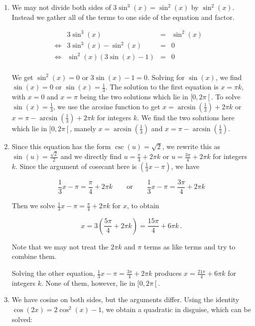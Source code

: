 \begin{example}
\begin{enumerate}
\item We may not divide both sides of $3\sin^{3}(x) = \sin^{2}(x)$ by $\sin^{2}(x)$. Instead we gather all of the terms to one side of the equation and factor.

\[ \begin{array}{rrclr}

&3\sin^{3}(x) & = &  \sin^{2}(x) & \\
\Leftrightarrow&3\sin^{3}(x) -  \sin^{2}(x) & = & 0 &  \\
\Leftrightarrow&\sin^{2}(x) (3 \sin(x) - 1) & = & 0 & \\ \end{array} \]

We get $\sin^{2}(x) = 0$ or $3\sin(x) - 1 = 0$. Solving for $\sin(x)$, we find  $\sin(x) = 0$ or $\sin(x) = \frac{1}{3}$.  The solution to the first equation is $x = \pi k$, with $x = 0$ and $x = \pi$ being the two solutions which lie in $[0,2\pi\left[\right.$.  To solve $\sin(x) = \frac{1}{3}$, we use the arcsine function to get $x = \arcsin\left(\frac{1}{3}\right) + 2\pi k$ or $x = \pi - \arcsin\left(\frac{1}{3}\right) + 2\pi k$ for integers $k$. We find the two solutions here which lie in $[0,2\pi\left[\right.$, manely $x = \arcsin\left(\frac{1}{3}\right)$ and $x = \pi - \arcsin\left(\frac{1}{3}\right)$.  

\item  Since this equation has the form $\csc(u) = \sqrt{2}$, we rewrite this as $\sin(u) = \frac{\sqrt{2}}{2}$ and we directly find $u = \frac{\pi}{4} + 2\pi k$ or $u = \frac{3\pi}{4} + 2\pi  k$ for integers $k$.  Since the argument of cosecant here is $\left(\frac{1}{3}x-\pi \right)$, we have


\[ \frac{1}{3}x-\pi = \frac{\pi}{4} + 2\pi k \qquad \text{or} \qquad  \frac{1}{3}x-\pi = \frac{3\pi}{4} + 2\pi k\]


Then we solve $\frac{1}{3}x-\pi = \frac{\pi}{4} + 2\pi k$ for $x$, to obtain 

\[ x = 3 \left( \frac{5\pi}{4} + 2\pi k \right) = \frac{15 \pi}{4} + 6\pi k \,.\]

Note that we may not treat the $2\pi k$ and $\pi$ terms as like terms and try to combine them.

Solving the other equation, $\frac{1}{3}x-\pi = \frac{3\pi}{4} + 2\pi k$ produces $x = \frac{21\pi}{4} + 6 \pi k$ for integers $k$. None of them, however,  lie in $[0,2\pi\left[\right.$. 

\item We have cosine on both sides, but the arguments differ.  Using the identity $\cos(2x) = 2\cos^{2}(x) - 1$, we obtain a quadratic in disguise, which can be solved:


\end{enumerate}
\end{example}
